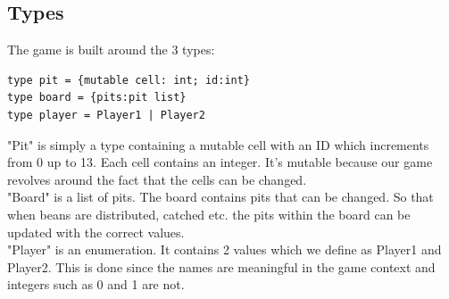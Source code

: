 \documentclass{article}
\begin{document}
\subsection*{Types}
The game is built around the 3 types:
\lstset{language=Python,numbers=left,stepnumber=1}
\begin{lstlisting}[frame=single]
type pit = {mutable cell: int; id:int}
type board = {pits:pit list}
type player = Player1 | Player2
\end{lstlisting}
"Pit" is simply a type containing a mutable cell with an ID which increments from 0 up to 13. Each cell contains an integer. It's mutable because our game revolves around the fact that the cells can be changed.\\
"Board" is a list of pits. The board contains pits that can be changed. So that when beans are distributed, catched etc. the pits within the board can be updated with the correct values.\\
"Player" is an enumeration. It contains 2 values which we define as Player1 and Player2. This is done since the names are meaningful in the game context and integers such as 0 and 1 are not.
\end{document}
